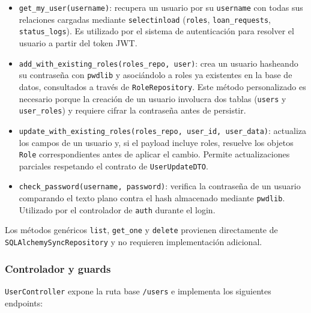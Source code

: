 \begin{itemize}
	\item \texttt{get\_my\_user(username)}: recupera un usuario por su \texttt{username} con todas sus relaciones cargadas mediante \texttt{selectinload} (\texttt{roles}, \texttt{loan\_requests}, \texttt{status\_logs}). Es utilizado por el sistema de autenticación para resolver el usuario a partir del token JWT.
	
	\item \texttt{add\_with\_existing\_roles(roles\_repo, user)}: crea un usuario hasheando su contraseña con \texttt{pwdlib} y asociándolo a roles ya existentes en la base de datos, consultados a través de \texttt{RoleRepository}. Este método personalizado es necesario porque la creación de un usuario involucra dos tablas (\texttt{users} y \texttt{user\_roles}) y requiere cifrar la contraseña antes de persistir.
	
	\item \texttt{update\_with\_existing\_roles(roles\_repo, user\_id, user\_data)}: actualiza los campos de un usuario y, si el payload incluye roles, resuelve los objetos \texttt{Role} correspondientes antes de aplicar el cambio. Permite actualizaciones parciales respetando el contrato de \texttt{UserUpdateDTO}.
	
	\item \texttt{check\_password(username, password)}: verifica la contraseña de un usuario comparando el texto plano contra el hash almacenado mediante \texttt{pwdlib}. Utilizado por el controlador de \texttt{auth} durante el login.
\end{itemize}

Los métodos genéricos \texttt{list}, \texttt{get\_one} y \texttt{delete} provienen directamente de \texttt{SQLAlchemySyncRepository} y no requieren implementación adicional.

\subsubsection*{Controlador y guards}

\texttt{UserController} expone la ruta base \texttt{/users} e implementa los siguientes endpoints:

